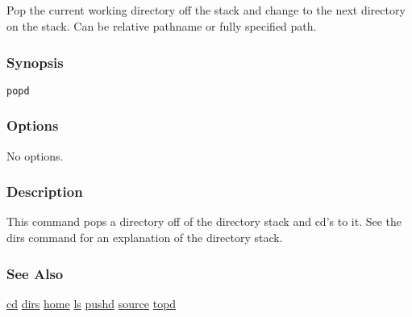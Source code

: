 \subsection{}
\label{popd}
Pop the current working directory off the stack and change to the next directory on the stack. Can be relative pathname or fully specified path. 
\subsubsection*{Synopsis}
\begin{verbatim}
popd
\end{verbatim}
\subsubsection*{Options}
 No options. 
\subsubsection*{Description}
 This command pops a directory off of the directory stack and cd's to it. See the dirs command for an explanation of the directory stack. 
\subsubsection*{See Also}
\hyperref[cd]{cd} \hyperref[dirs]{dirs} \hyperref[home]{home} \hyperref[ls]{ls} \hyperref[pushd]{pushd} \hyperref[source]{source} \hyperref[topd]{topd} 